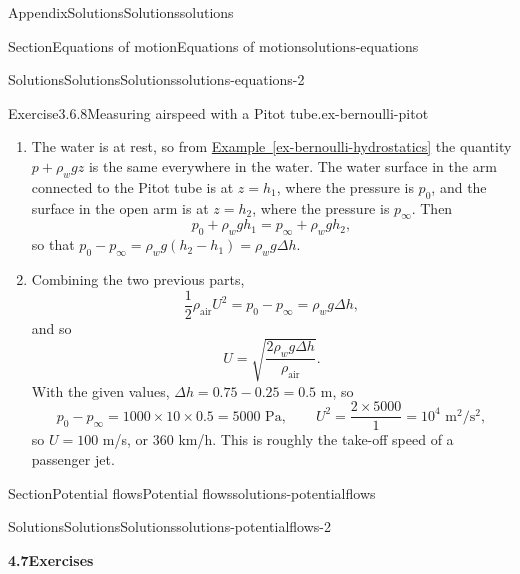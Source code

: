 \documentclass[oneside,10pt,]{book}
\newcommand{\xreffont}{\relax}
\numberwithin{equation}{section}
\begin{document}
\begin{appendixptx}{Appendix}{Solutions}{}{Solutions}{}{}{solutions}
\begin{sectionptx}{Section}{Equations of motion}{}{Equations of motion}{}{}{solutions-equations}
\begin{solutions-subsection-numberless}{Solutions}{Solutions}{}{Solutions}{}{}{solutions-equations-2}
\begin{divisionsolution}{Exercise}{3.6.8}{Measuring airspeed with a Pitot tube.}{ex-bernoulli-pitot}
\begin{enumerate}[font=\bfseries,label=(\alph*),ref=\alph*]
\item[(b)]\noindent\hypertarget{ex-bernoulli-pitot-4-2-main}{}The water is at rest, so from \hyperref[ex-bernoulli-hydrostatics]{Example~{\xreffont\ref{ex-bernoulli-hydrostatics}}} the quantity \(p + \rho_w g z\) is the same everywhere in the water. The water surface in the arm connected to the Pitot tube is at \(z = h_1\), where the pressure is \(p_0\), and the surface in the open arm is at \(z = h_2\), where the pressure is \(p_\infty\). Then%
\begin{equation*}
p_0 + \rho_w g h_1 = p_\infty + \rho_w g h_2,
\end{equation*}
so that \(p_0 - p_\infty = \rho_w g (h_2 - h_1) = \rho_w g \Delta h\).%
\item[(c)]\noindent\hypertarget{ex-bernoulli-pitot-5-2-main}{}Combining the two previous parts,%
\begin{equation*}
\frac12 \rho_\text{air} U^2 = p_0 - p_\infty = \rho_w g \Delta h,
\end{equation*}
and so%
\begin{equation*}
U = \sqrt{\frac{2 \rho_w g \Delta h}{\rho_\text{air}}}.
\end{equation*}
With the given values, \(\Delta h = 0.75 - 0.25 = 0.5\) m, so%
\begin{equation*}
p_0 - p_\infty = 1000 \times 10 \times 0.5 = 5000 \text{ Pa}, \qquad U^2 =
\frac{2 \times 5000}{1} = 10^4 \text{ m}^2/\text{s}^2,
\end{equation*}
so \(U = 100\) m\slash{}s, or \(360\) km\slash{}h. This is roughly the take-off speed of a passenger jet.%
\end{enumerate}%
\end{divisionsolution}%
\end{solutions-subsection-numberless}
\end{sectionptx}
%
%
\typeout{************************************************}
\typeout{************************************************}
%
\begin{sectionptx}{Section}{Potential flows}{}{Potential flows}{}{}{solutions-potentialflows}
%
%
\typeout{************************************************}
\typeout{************************************************}
%
\begin{solutions-subsection-numberless}{Solutions}{Solutions}{}{Solutions}{}{}{solutions-potentialflows-2}
\par\medskip
\noindent\textbf{\normalsize{}4.7\space\textperiodcentered\space{}Exercises}

\end{solutions-subsection-numberless}
\end{sectionptx}
\end{appendixptx}
\end{document}
